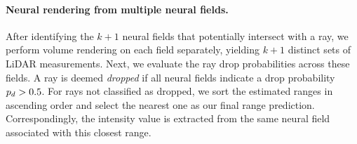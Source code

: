 \paragraph{Neural rendering from multiple neural fields.}
 After identifying the $k+1$ neural fields that potentially intersect with a ray, we perform volume rendering on each field separately, yielding $k+1$ distinct sets of LiDAR measurements. Next, we evaluate the ray drop probabilities across these fields. A ray is deemed \textit{dropped} if all neural fields indicate a drop probability $p_d > 0.5$. For rays not classified as dropped, we sort the estimated ranges in ascending order and select the nearest one as our final range prediction. Correspondingly, the intensity value is extracted from the same neural field associated with this closest range.








